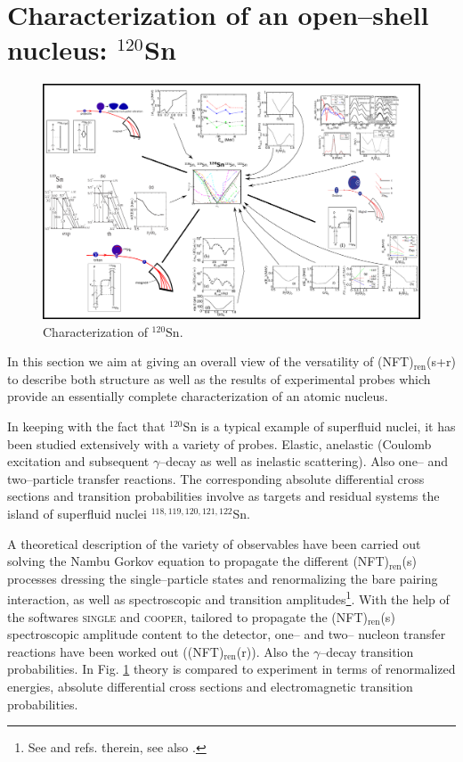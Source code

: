           
\section{Characterization of an open--shell nucleus: $^{120}$Sn}\label{S1.10}
          \begin{figure}
          \centerline {
          \includegraphics*[width=24cm, angle=90]{introduccion/figs/fig1_4_1}}
          \caption{Characterization of $^{120}$Sn.}
          \label{fig1.4.1}
          \end{figure}
          In this section we aim at giving an overall view of
the versatility of (NFT)$_{\text{ren}}$(s+r) to describe both structure as well as the results of experimental probes which provide an essentially complete characterization of an atomic nucleus. 


In keeping with the fact that $^{120}$Sn is a 
 typical example of superfluid nuclei, it has been studied extensively with a variety of probes.  Elastic, anelastic (Coulomb excitation and subsequent $\gamma$--decay as well as inelastic scattering). Also one-- and two--particle transfer reactions. The corresponding absolute differential cross sections and transition probabilities  involve as targets and residual systems the island of superfluid nuclei $^{118,119,120,121,122}$Sn.
 
 
  A theoretical description of the variety of observables  have been carried out  solving the Nambu Gorkov equation to propagate the different  (NFT)$_{\text{ren}}$(s) processes dressing the single--particle states and renormalizing the bare pairing interaction, as well as spectroscopic and transition amplitudes\footnote{See \cite{Idini:15} and refs. therein, see also \cite{Broglia:16}.}. With the help of the softwares \textsc{single} and \textsc{cooper}, tailored to propagate the (NFT)$_{\text{ren}}$(s) spectroscopic amplitude content to the detector, one-- and two-- nucleon transfer reactions have been worked out ((NFT)$_{\text{ren}}$(r)). Also the $\gamma$--decay transition probabilities. In Fig. \ref{fig1.4.1} theory is compared to experiment in terms of renormalized energies, absolute differential cross sections and electromagnetic transition probabilities. 
  
